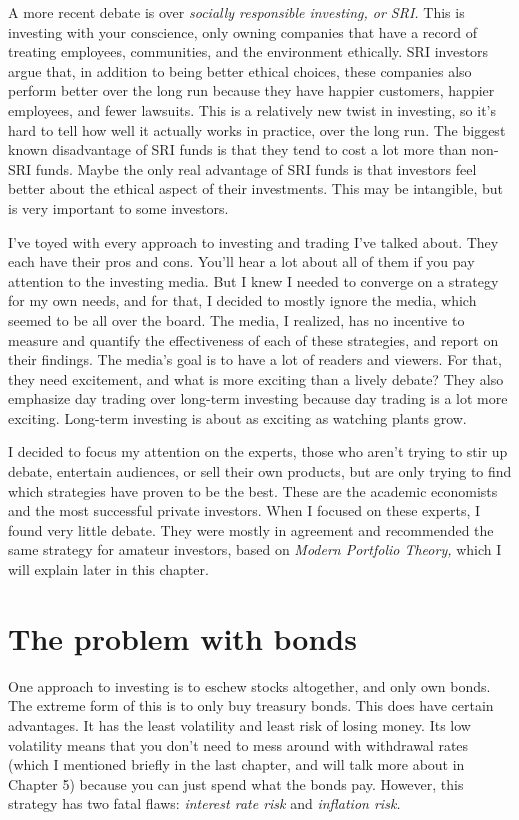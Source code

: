 A more recent debate is over \emph{socially responsible investing, or SRI.} This is investing with your conscience, only owning companies that have a record of treating employees, communities, and the environment ethically. SRI investors argue that, in addition to being better ethical choices, these companies also perform better over the long run because they have happier customers, happier employees, and fewer lawsuits. This is a relatively new twist in investing, so it's hard to tell how well it actually works in practice, over the long run. The biggest known disadvantage of SRI funds is that they tend to cost a lot more than non-SRI funds. Maybe the only real advantage of SRI funds is that investors feel better about the ethical aspect of their investments. This may be intangible, but is very important to some investors.

I've toyed with every approach to investing and trading I've talked about. They each have their pros and cons. You'll hear a lot about all of them if you pay attention to the investing media. But I knew I needed to converge on a strategy for my own needs, and for that, I decided to mostly ignore the media, which seemed to be all over the board. The media, I realized, has no incentive to measure and quantify the effectiveness of each of these strategies, and report on their findings. The media's goal is to have a lot of readers and viewers. For that, they need excitement, and what is more exciting than a lively debate? They also emphasize day trading over long-term investing because day trading is a lot more exciting. Long-term investing is about as exciting as watching plants grow.

I decided to focus my attention on the experts, those who aren't trying to stir up debate, entertain audiences, or sell their own products, but are only trying to find which strategies have proven to be the best. These are the academic economists and the most successful private investors. When I focused on these experts, I found very little debate. They were mostly in agreement and recommended the same strategy for amateur investors, based on \emph{Modern Portfolio Theory,} which I will explain later in this chapter.

\section{The problem with bonds}
One approach to investing is to eschew stocks altogether, and only own bonds. The extreme form of this is to only buy treasury bonds. This does have certain advantages. It has the least volatility and least risk of losing money. Its low volatility means that you don't need to mess around with withdrawal rates (which I mentioned briefly in the last chapter, and will talk more about in Chapter 5) because you can just spend what the bonds pay. However, this strategy has two fatal flaws: \emph{interest rate risk} and \emph{inflation risk.}

